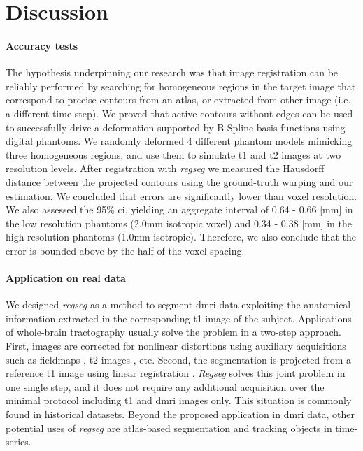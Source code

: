 \section{Discussion}
\label{sec:discussion}

\paragraph*{Accuracy tests}
The hypothesis underpinning our research was that image registration can be reliably performed
  by searching for homogeneous regions in the target image that correspond to precise contours
  from an atlas, or extracted from other image (i.e. a different time step).
We proved that active contours without edges can be used to successfully drive a
  deformation supported by B-Spline basis functions using digital phantoms.
We randomly deformed 4 different phantom models mimicking three homogeneous regions,
  and use them to simulate \gls*{t1} and \gls*{t2} images at two resolution levels.
After registration with \emph{regseg} we measured the Hausdorff distance between the
  projected contours using the ground-truth warping and our estimation.
We concluded that errors are significantly lower than voxel resolution.
We also assessed the 95\% \gls*{ci}, yielding an aggregate interval of
  0.64 - 0.66 [mm] in the low resolution phantoms (2.0mm isotropic voxel) and
  0.34 - 0.38 [mm] in the high resolution phantoms (1.0mm isotropic).
Therefore, we also conclude that the error is bounded above by the half of the
  voxel spacing.

\paragraph*{Application on real data}
We designed \emph{regseg} as a method to segment \gls*{dmri} data exploiting the
  anatomical information extracted in the corresponding \gls*{t1} image of the subject.
Applications of whole-brain tractography \citep{smith_tractbased_2006,craddock_imaging_2013}
  usually solve the problem in a two-step approach.
First, images are corrected for nonlinear distortions using auxiliary acquisitions
  such as fieldmaps \citep{jezzard_correction_1995}, \gls*{t2} images \citep{kybic_fast_2003},
  etc.
Second, the segmentation is projected from a reference \gls*{t1} image using linear
  registration \citep{greve_accurate_2009}.
\emph{Regseg} solves this joint problem in one single step, and it does not require any additional
  acquisition over the minimal protocol including \gls*{t1} and \gls*{dmri} images only.
This situation is commonly found in historical datasets.
Beyond the proposed application in \gls*{dmri} data, other potential uses of \emph{regseg} are
  atlas-based segmentation and tracking objects in time-series.

